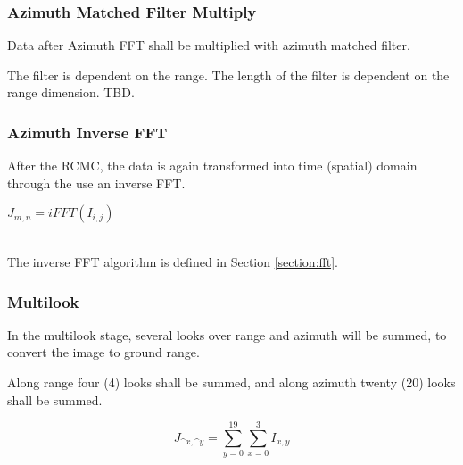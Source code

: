 \subsubsection{Azimuth Matched Filter Multiply}
Data after Azimuth FFT shall be multiplied with azimuth matched filter.

The  filter is dependent on the range. The length of the filter is dependent on the range dimension. TBD. 


\subsubsection{Azimuth Inverse FFT}
After the RCMC, the data is again transformed into time (spatial) domain through the use an inverse FFT.

\begin{center}
\(J_{m,n} = iFFT(I_{i,j}) \)
\end{center}
\\
The inverse FFT algorithm is defined in Section \ref{section:fft}.

\subsubsection{Multilook}
In the multilook stage, several looks over range and azimuth will be summed, to convert the image to ground range. 

Along range four (4) looks shall be summed, and along azimuth twenty (20) looks shall be summed. 

\[J_{\^x, \^y} = \sum\limits_{y=0}^{19} \sum\limits_{x=0}^{3} I_{x, y}\]